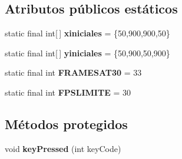 \subsection*{Atributos públicos estáticos}
\begin{DoxyCompactItemize}
\item 
\hypertarget{classBatallaEspacial_1_1Juego_a7c2d4bf040a8a1287968cfbf697f4115}{
static final int\mbox{[}$\,$\mbox{]} {\bfseries xiniciales} = \{50,900,900,50\}}
\label{classBatallaEspacial_1_1Juego_a7c2d4bf040a8a1287968cfbf697f4115}

\item 
\hypertarget{classBatallaEspacial_1_1Juego_a2b17ba16671f2fe0ce010223a926a04b}{
static final int\mbox{[}$\,$\mbox{]} {\bfseries yiniciales} = \{50,900,50,900\}}
\label{classBatallaEspacial_1_1Juego_a2b17ba16671f2fe0ce010223a926a04b}

\item 
\hypertarget{classBatallaEspacial_1_1Juego_af23376bd0397d5524a9636000386b6ef}{
static final int {\bfseries FRAMESAT30} = 33}
\label{classBatallaEspacial_1_1Juego_af23376bd0397d5524a9636000386b6ef}

\item 
\hypertarget{classBatallaEspacial_1_1Juego_a87854cd06609c0127da626202eff4873}{
static final int {\bfseries FPSLIMITE} = 30}
\label{classBatallaEspacial_1_1Juego_a87854cd06609c0127da626202eff4873}

\end{DoxyCompactItemize}
\subsection*{Métodos protegidos}
\begin{DoxyCompactItemize}
\item 
\hypertarget{classBatallaEspacial_1_1Juego_ab0f0c1a20e01a82d995b475707d313d3}{
void {\bfseries keyPressed} (int keyCode)}
\label{classBatallaEspacial_1_1Juego_ab0f0c1a20e01a82d995b475707d313d3}

\end{DoxyCompactItemize}

